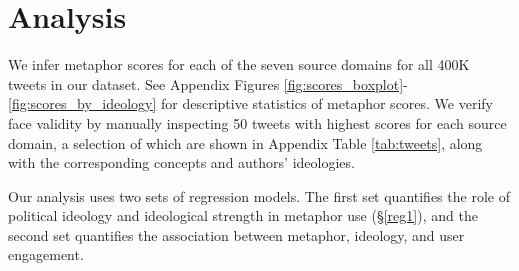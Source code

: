 \section{Analysis}

We infer metaphor scores for each of the seven source domains for all 400K tweets in our dataset. See Appendix Figures \ref{fig:scores_boxplot}-\ref{fig:scores_by_ideology} for descriptive statistics of metaphor scores. We verify face validity by manually inspecting 50 tweets with highest scores for each source domain, a selection of which are shown in Appendix Table \ref{tab:tweets}, along with the corresponding concepts and authors' ideologies.  

Our analysis uses two sets of regression models. The first set quantifies the role of political ideology and ideological strength in metaphor use (§\ref{reg1}), and the second set quantifies the association between metaphor, ideology, and user engagement. 










